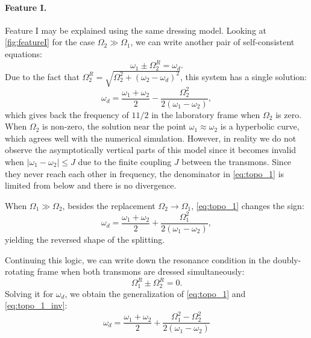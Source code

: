 \documentclass[%
 aps, prx,
 amsmath,amssymb,
 reprint,%
superscriptaddress
]{revtex4-2}
\begin{document}
\paragraph{Feature I.} Feature I may be explained using the same dressing model. Looking at \autoref{fig:featureI} for the case $\Omega_2 \gg \Omega_1$, we can write another pair of self-consistent equations:
\begin{equation}
\omega_{1} \pm \Omega_2^R = \omega_d.
\end{equation}
Due to the fact that $\Omega_2^R = \sqrt{\Omega_2^2 + (\omega_2 - \omega_d)^2}$, this system has a single solution:
\begin{equation}
\omega_d = \frac{\omega_1 + \omega_2}{2} - \frac{ \Omega_{2}^{2}}{2 \left(\omega_{1} - \omega_{2}\right)},
\label{eq:topo_1}
\end{equation}
which gives back the frequency of $11/2$ in the laboratory frame when $\Omega_2$ is zero. When $\Omega_2$ is non-zero, the solution near the point $\omega_1 \approx \omega_2$ is a hyperbolic curve, which agrees well with the numerical simulation. However, in reality we do not observe the asymptotically vertical parts of this model since it becomes invalid when $|\omega_1 - \omega_2| \leq J$ due to the finite coupling $J$ between the transmons. Since they never reach each other in frequency, the denominator in \eqref{eq:topo_1} is limited from below and there is no divergence.

When $\Omega_1 \gg \Omega_2$, besides the 
replacement $\Omega_2 \rightarrow \Omega_1$, 
\autoref{eq:topo_1} changes the sign:
\begin{equation}
\omega_d = \frac{\omega_1 + \omega_2}{2} + \frac{ \Omega_{1}^{2}}{2 \left(\omega_{1} - \omega_{2}\right)},
\label{eq:topo_1_inv}
\end{equation}
yielding the reversed shape of the splitting.

Continuing this logic, we can write down the resonance condition in the doubly-rotating frame when both transmons are dressed simultaneously:
\begin{equation}
\Omega_1^R \pm \Omega_2^R = 0.
\label{eq:zero-photon}
\end{equation}
Solving it for $\omega_d$, we obtain the 
generalization of \autoref{eq:topo_1} and 
\autoref{eq:topo_1_inv}:
\begin{equation}
\omega_d = \frac{\omega_{1} + \omega_{2}}{2} + \frac{\Omega_{1}^{2} - \Omega_{2}^{2}}{ 2\left(\omega_{1} - \omega_{2}\right)}
\label{eq:topo_comm}
\end{equation}
\end{document}
